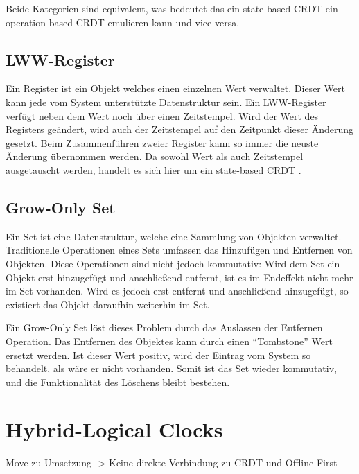 \documentclass[a4paper, 12pt]{scrreprt}
\begin{document}
Beide Kategorien sind equivalent\autocite[S. 9]{InproceedingsCRDTOriginal}, was bedeutet das ein state-based CRDT ein operation-based CRDT emulieren kann und vice versa.


\subsection{LWW-Register}
Ein Register ist ein Objekt welches einen einzelnen Wert verwaltet. Dieser Wert kann jede vom System unterstützte Datenstruktur sein. Ein \ac{LWW-Register} verfügt neben dem Wert noch über einen Zeitstempel. Wird der Wert des Registers geändert, wird auch der Zeitstempel auf den Zeitpunkt dieser Änderung gesetzt. Beim Zusammenführen zweier Register kann so immer die neuste Änderung übernommen werden. Da sowohl Wert als auch Zeitstempel ausgetauscht werden, handelt es sich hier um ein state-based CRDT \autocite[S. ?]{InproceedingsCRDTOriginal}. 

\subsection{Grow-Only Set}
Ein Set ist eine Datenstruktur, welche eine Sammlung von Objekten verwaltet. Traditionelle Operationen eines Sets umfassen das Hinzufügen und Entfernen von Objekten. Diese Operationen sind nicht jedoch kommutativ: Wird dem Set ein Objekt erst hinzugefügt und anschließend entfernt, ist es im Endeffekt nicht mehr im Set vorhanden. Wird es jedoch erst entfernt und anschließend hinzugefügt, so existiert das Objekt daraufhin weiterhin im Set.

Ein Grow-Only Set löst dieses Problem durch das Auslassen der Entfernen Operation. Das Entfernen des Objektes kann durch einen \enquote{Tombstone} Wert ersetzt werden. Ist dieser Wert positiv, wird der Eintrag vom System so behandelt, als wäre er nicht vorhanden. Somit ist das Set wieder kommutativ, und die Funktionalität des Löschens bleibt bestehen. 


\section{Hybrid-Logical Clocks}
Move zu Umsetzung -> Keine direkte Verbindung zu CRDT und Offline First

\newpage
\printbibliography
\end{document}
